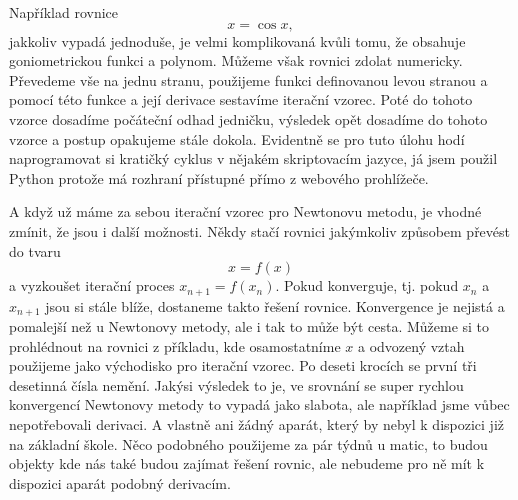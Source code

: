 \documentclass[12pt]{article}
\begin{document}
Například rovnice $$x=\cos x,$$ jakkoliv vypadá jednoduše, je velmi komplikovaná kvůli tomu, že obsahuje goniometrickou funkci a polynom. Můžeme však rovnici zdolat numericky. Převedeme vše na jednu stranu, použijeme funkci definovanou levou stranou a pomocí této funkce a její derivace sestavíme iterační vzorec. Poté do tohoto vzorce dosadíme počáteční odhad jedničku, výsledek opět dosadíme do tohoto vzorce a postup opakujeme stále dokola. Evidentně se pro tuto úlohu hodí naprogramovat si kratičký cyklus v nějakém skriptovacím jazyce, já jsem použil Python protože má rozhraní přístupné přímo z webového prohlížeče.

A když už máme za sebou iterační vzorec pro Newtonovu metodu, je vhodné zmínit, že jsou i další možnosti. Někdy stačí rovnici jakýmkoliv způsobem převést do tvaru $$x=f(x)$$ a vyzkoušet iterační proces $x_{n+1}=f(x_n)$. Pokud konverguje, tj. pokud $x_n$ a $x_{n+1}$ jsou si stále blíže, dostaneme takto řešení rovnice. Konvergence je nejistá a pomalejší než u Newtonovy metody, ale i tak to může být cesta. Můžeme si to prohlédnout na rovnici z příkladu, kde osamostatníme $x$ a odvozený vztah použijeme jako východisko pro iterační vzorec. Po deseti krocích se první tři desetinná čísla nemění. Jakýsi výsledek to je, ve srovnání se super rychlou konvergencí Newtonovy metody to vypadá jako slabota, ale například jsme vůbec nepotřebovali derivaci. A vlastně ani žádný aparát, který by nebyl k dispozici již na základní škole. Něco podobného použijeme za pár týdnů u matic, to budou objekty kde nás také budou zajímat řešení rovnic, ale nebudeme pro ně mít k dispozici aparát podobný derivacím.
\end{document}
